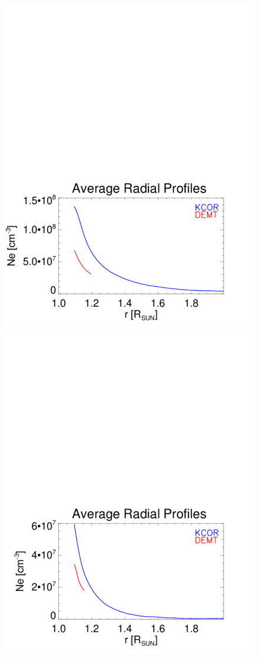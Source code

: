 \documentclass[baaa]{baaa}
\begin{document}
\begin{figure}[!ht]
  \includegraphics[width=0.75\columnwidth]{Average_Radial_Profiles_KCOR-Tom_vs_DEMT_CR2198_Hh_l39_kcor_1e-5_bloqueados-Quiet-region1.pdf}
  \hskip 2cm
  \includegraphics[width=0.75\columnwidth]{Average_Radial_Profiles_KCOR-Tom_vs_DEMT_CR2198_Hh_l39_kcor_1e-5_bloqueados-Open-region_N.pdf}

\end{figure}
\end{document}

